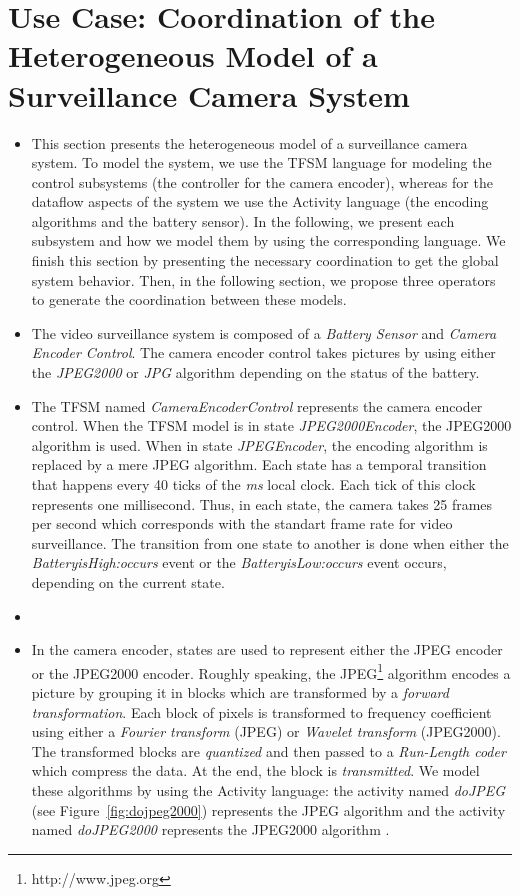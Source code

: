 \section{Use Case: Coordination of the Heterogeneous Model of a Surveillance Camera System}
\begin{itemize}
	\item This section presents the heterogeneous model of a surveillance camera system. To model the system, we use the TFSM language for modeling the control subsystems (\ie the controller for the camera encoder), whereas for the dataflow aspects of the system we use the Activity language (\ie the encoding algorithms and the battery sensor). In the following, we present each subsystem and how we model them by using the corresponding language. We finish this section by presenting the necessary coordination to get the global system behavior. Then, in the following section, we propose three operators to generate the coordination between these models. 
	
	\item The video surveillance system is composed of a \emph{Battery Sensor} and \emph{Camera Encoder Control}. The camera encoder control takes pictures by using either the \emph{JPEG2000} or \emph{JPG} algorithm depending on the status of the battery. 
	
	
	
	\item The TFSM named \emph{CameraEncoderControl} represents the camera encoder control. When the TFSM model is in state \emph{JPEG2000Encoder}, the JPEG2000 algorithm is used. When in state \emph{JPEGEncoder}, the encoding algorithm is replaced by a mere JPEG algorithm. Each state has a temporal transition that happens every 40 ticks of the \emph{ms} local clock. Each tick of this clock represents one millisecond. Thus, in each state, the camera takes 25 frames per second which corresponds with the standart frame rate for video surveillance. The transition from one state to another is done when either the \emph{BatteryisHigh:occurs} event or the \emph{BatteryisLow:occurs} event occurs, depending on the current state.	
	
	\item {}
	
	\item In the camera encoder, states are used to represent either the JPEG encoder or the JPEG2000 encoder. Roughly speaking, the JPEG\footnote{http://www.jpeg.org} algorithm encodes a picture by grouping it in blocks which are transformed by a \textit{forward transformation}. Each block of pixels is transformed to frequency coefficient using either a \textit{Fourier transform} (JPEG) or \textit{Wavelet transform} (JPEG2000). The transformed blocks are \textit{quantized} and then passed to a \textit{Run-Length coder} which compress the data. At the end, the block is \textit{transmitted}. We model these algorithms by using the Activity language: the activity named \emph{doJPEG} (see Figure~\ref{fig:dojpeg2000}) represents the JPEG algorithm and the activity named \emph{doJPEG2000} represents the JPEG2000 algorithm . 



\end{itemize}
